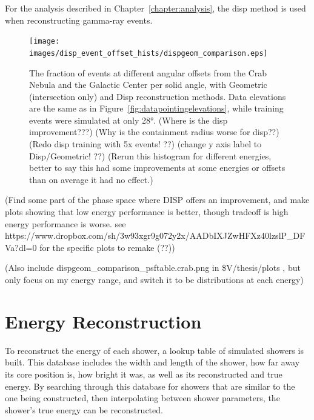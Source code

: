     For the analysis described in Chapter~\ref{chapter:analysis}, the disp method is used when reconstructing gamma-ray events.

    \begin{figure}[!p]
      \centering
      \texttt{[image: images/disp\_event\_offset\_hists/dispgeom\_comparison.eps]}
      \caption[DISP Offset Improvement]{
        The fraction of events at different angular offsets from the Crab Nebula and the Galactic Center per solid angle, with Geometric (intersection only) and Disp reconstruction methods.
        Data elevations are the same as in Figure~\ref{fig:datapointingelevations}, while training events were simulated at only \ang{28}.
        {\color{red}(Where is the disp improvement???)}
        {\color{red}(Why is the containment radius worse for disp??)}
        {\color{red}(Redo disp training with 5x events! ??)}
        {\color{red}(change y axis label to Disp/Geometric! ??)}
        {\color{red}(Rerun this histogram for different energies, better to say this had some improvements at some energies or offsets than on average it had no effect.)}
      }
      \label{fig:disp_event_offset}
    \end{figure}
  
  {\color{red}(Find some part of the phase space where DISP offers an improvement, and make plots showing that low energy performance is better, though tradeoff is high energy performance is worse. see https://www.dropbox.com/sh/3w93xgr9g072y2x/AADbIXJZwHFXz40lzslP\_DFVa?dl=0 for the specific plots to remake (??))}
  
  {\color{red}(Also include dispgeom\_comparison\_psftable.crab.png in \$V/thesis/plots , but only focus on my energy range, and switch it to be distributions at each energy)}

  
  \FloatBarrier

\section{Energy Reconstruction}\label{subsec:enrecon}
  To reconstruct the energy of each shower, a lookup table of simulated showers is built.
This database includes the width and length of the shower, how far away its core position is, how bright it was, as well as its reconstructed and true energy.
  By searching through this database for showers that are similar to the one being constructed, then interpolating between shower parameters, the shower's true energy can be reconstructed.


